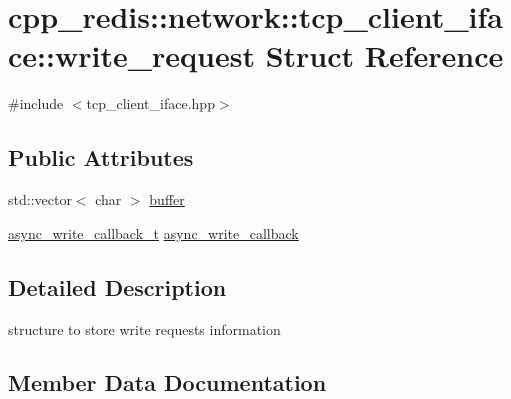 \hypertarget{structcpp__redis_1_1network_1_1tcp__client__iface_1_1write__request}{}\section{cpp\+\_\+redis\+:\+:network\+:\+:tcp\+\_\+client\+\_\+iface\+:\+:write\+\_\+request Struct Reference}
\label{structcpp__redis_1_1network_1_1tcp__client__iface_1_1write__request}


{\ttfamily \#include $<$tcp\+\_\+client\+\_\+iface.\+hpp$>$}

\subsection*{Public Attributes}
\begin{DoxyCompactItemize}
\item 
std\+::vector$<$ char $>$ \mbox{\hyperlink{structcpp__redis_1_1network_1_1tcp__client__iface_1_1write__request_ad3567dac827f550b60491af530f0db2e}{buffer}}
\item 
\mbox{\hyperlink{classcpp__redis_1_1network_1_1tcp__client__iface_a1dc52ccc70cf377c4fbb495a16adc658}{async\+\_\+write\+\_\+callback\+\_\+t}} \mbox{\hyperlink{structcpp__redis_1_1network_1_1tcp__client__iface_1_1write__request_ab2823d9836ec68d63c9799ee12d403a2}{async\+\_\+write\+\_\+callback}}
\end{DoxyCompactItemize}


\subsection{Detailed Description}
structure to store write requests information 

\subsection{Member Data Documentation}
\mbox{\label{structcpp__redis_1_1network_1_1tcp__client__iface_1_1write__request_ab2823d9836ec68d63c9799ee12d403a2}} 
